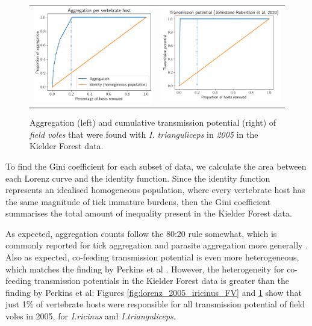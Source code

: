 \documentclass{article}
\begin{document}
\begin{figure}[]
	\begin{mdframed}[backgroundcolor=grey250,rightline=false,leftline=false,topline=false]
	\centering
	\begin{tabular}{ll}
		\includegraphics[width=.48\linewidth,valign=m]{lorenz_aggregation_FV_2005_I.Trianguliceps} & \includegraphics[width=.48\linewidth,valign=m]{lorenz_JR_FV_2005_I.Trianguliceps} \\
	\end{tabular}
	\caption{Aggregation (left) and cumulative transmission potential (right) of \textit{field voles} that were found with \textit{I. trianguliceps} in \textit{2005} in the Kielder Forest data.}
	\label{fig:lorenz_2005_itrianguliceps_FV}
	\end{mdframed}
\end{figure}

To find the Gini coefficient for each subset of data, we calculate the area between each Lorenz curve and the identity function. Since the identity function represents an idealised homogeneous population, where every vertebrate host has the same magnitude of tick immature burdens, then the Gini coefficient summarises the total amount of inequality present in the Kielder Forest data. 

As expected, aggregation counts follow the 80:20 rule somewhat, which is commonly reported for tick aggregation and parasite aggregation more generally \cite{}. Also as expected, co-feeding transmission potential is even more heterogeneous, which matches the finding by Perkins et al \cite{}. However, the heterogeneity for co-feeding transmission potentials in the Kielder Forest data is greater than the finding by Perkins et al: Figures \ref{fig:lorenz_2005_iricinus_FV} and \ref{fig:lorenz_2005_itrianguliceps_FV} show that just 1\% of vertebrate hosts were responsible for all transmission potential of field voles in 2005, for \textit{I.ricinus} and \textit{I.trianguliceps}.
\end{document}
